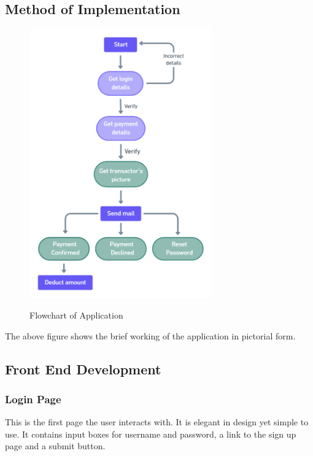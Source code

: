 \documentclass[12pt, oneside, a4paper]{article}
\begin{document}
\subsection{Method of Implementation}
\vspace{0.5cm}
\begin{figure}[H]
\begin{center}
\includegraphics[width=0.7\textwidth]{Implementation.png}\\
\caption{Flowchart of Application}
\label{fig:Figure 5}
\end{center}
\end{figure}

The above figure shows the brief working of the application in pictorial form.


\pagebreak

\subsection{Front End Development}
\vspace{0.5cm}
\subsubsection{Login Page}
This is the first page the user interacts with. It is elegant in design yet simple to use. It contains input boxes for username and password, a link to the sign up page and a submit button.
\end{document}
